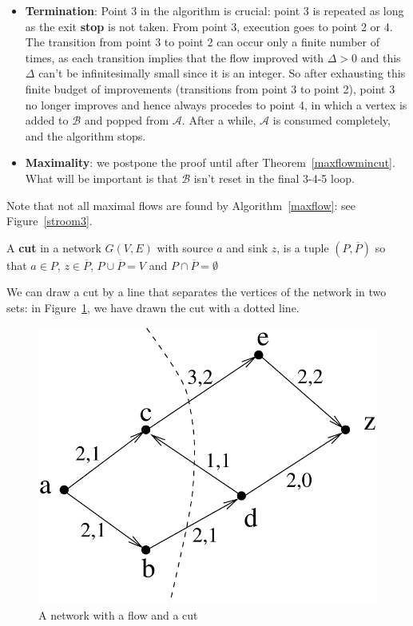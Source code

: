 \begin{proof*}
	\begin{itemize}
		\item \textbf{Termination}:
		Point 3 in the algorithm is crucial: point 3 is repeated as long as
		the exit \textbf{stop} is not taken. From point 3, execution goes to
		point 2 or 4. The transition from point 3 to point 2 can occur only a
		finite number of times, as each transition implies that the flow
		improved with $\Delta > 0$ and this $\Delta$ can't be infinitesimally
		small since it is an integer.
		So after exhausting this finite budget of improvements (transitions from point 3 to point 
		2), point 3 no longer improves and hence always procedes to point 4, in which a vertex is
		added to $\mathcal{B}$ and popped from $\mathcal{A}$. After a
		while, $\mathcal{A}$ is consumed completely, and the algorithm stops.
		
		\item \textbf{Maximality}: we postpone the proof until after
		Theorem~\ref{maxflowmincut}. What will be important is that $\mathcal{B}$ isn't reset in the final 3-4-5 loop.
	\end{itemize}\vspace{-2em}
\end{proof*}

Note that not all maximal flows are found by Algorithm~\ref{maxflow}:
see Figure~\ref{stroom3}.

\begin{definition}
  \textup{A \textbf{cut} in a network $G(V,E)$ with source $a$ and sink
    $z$, is a tuple $(P,\overline{P})$
    so that $a \in P$, $z \in \overline{P}$, $P
    \cup \overline{P} = V$ and $P \cap \overline{P} = \emptyset$ }
\end{definition}

We can draw a cut by a line that separates the vertices of the network
in two sets: in Figure~\ref{snede1}, we have drawn the cut with a
dotted line.

\begin{figure}[ht]
	\centering
	\includegraphics[width=0.3\linewidth,keepaspectratio]{snede1} %
	\caption{A network with a flow and a cut\label{snede1}}
\end{figure}

